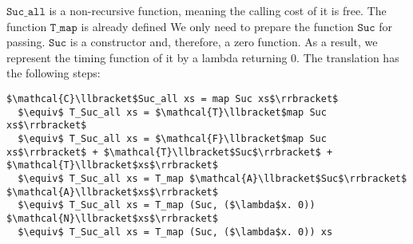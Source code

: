 $\texttt{Suc\_all}$ is a non-recursive function, meaning the calling cost of it is free.
The function $\texttt{T\_map}$ is already defined
We only need to prepare the function $\texttt{Suc}$ for passing.
$\texttt{Suc}$ is a constructor and, therefore, a zero function.
As a result, we represent the timing function of it by a lambda returning $0$.
The translation has the following steps:
\begin{lstlisting}[mathescape=true,language=translation]
  $\mathcal{C}\llbracket$Suc_all xs = map Suc xs$\rrbracket$
  $\equiv$ T_Suc_all xs = $\mathcal{T}\llbracket$map Suc xs$\rrbracket$
  $\equiv$ T_Suc_all xs = $\mathcal{F}\llbracket$map Suc xs$\rrbracket$ + $\mathcal{T}\llbracket$Suc$\rrbracket$ + $\mathcal{T}\llbracket$xs$\rrbracket$
  $\equiv$ T_Suc_all xs = T_map $\mathcal{A}\llbracket$Suc$\rrbracket$ $\mathcal{A}\llbracket$xs$\rrbracket$
  $\equiv$ T_Suc_all xs = T_map (Suc, ($\lambda$x. 0)) $\mathcal{N}\llbracket$xs$\rrbracket$
  $\equiv$ T_Suc_all xs = T_map (Suc, ($\lambda$x. 0)) xs
\end{lstlisting}
